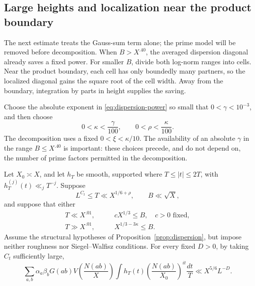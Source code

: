\subsection{Large heights and localization near the product boundary}

The next estimate treats the Gauss-sum term alone; the prime model will
be removed before decomposition. When \(B>X^{.40}\), the averaged
dispersion diagonal already saves a fixed power. For smaller \(B\),
divide both log-norm ranges into cells. Near the product boundary,
each cell has only boundedly many partners, so the localized diagonal
gains the square root of the cell width. Away from the boundary,
integration by parts in height supplies the saving.

Choose the absolute exponent in \eqref{eq:dispersion-power} so small
that \(0<\gamma<10^{-3}\), and then choose
\begin{equation}
 0<\kappa<\frac\gamma{100},\qquad
 0<\rho<\frac\kappa{100}.
 \label{eq:power-parameters}
\end{equation}
The decomposition uses a fixed \(0<\xi<\kappa/10\).
The availability of an absolute \(\gamma\) in the range
\(B\le X^{.40}\) is important: these choices precede, and do not
depend on, the number of prime factors permitted in the decomposition.

\begin{proposition}
\label{prop:bilinear-height}
Let \(X_0\asymp X\), and let \(h_T\) be smooth, supported where
\(T\le |t|\le2T\), with
\(h_T^{(j)}(t)\ll_jT^{-j}\). Suppose
\[
 L^{C_t}\le T\ll X^{1/6+\rho},\qquad B\ll\sqrt X,
\]
and suppose that either
\begin{align*}
 T\ll X^{.01},&\qquad cX^{1/3}\le B,\quad c>0\text{ fixed},\tag{a}\\
 T\gg X^{.01},&\qquad X^{1/3-3\kappa}\le B.\tag{b}
\end{align*}
Assume the structural hypotheses of Proposition~\ref{prop:dispersion},
but impose neither roughness nor Siegel--Walfisz conditions.
For every fixed \(D>0\), by taking \(C_t\) sufficiently large,
\begin{equation}
 \sum_{a,b}\alpha_a\beta_bG(ab)V\!\left(\frac{N(ab)}X\right)
 \int h_T(t)\left(\frac{N(ab)}{X_0}\right)^{it}\frac{dt}{T}
       \ll X^{5/6}L^{-D}.
 \label{eq:bilinear-integrated}
\end{equation}
\end{proposition}

